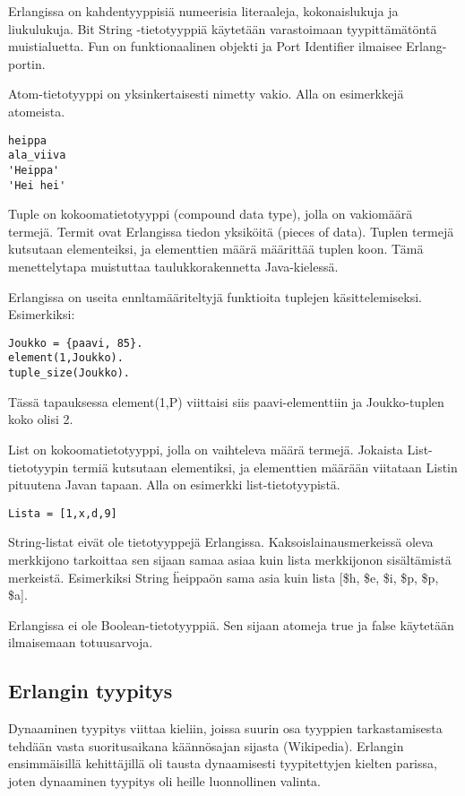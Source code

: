 \documentclass[11pt,oneside,a4paper]{article}
\begin{document}
Erlangissa on kahdentyyppisiä numeerisia literaaleja, kokonaislukuja ja
liukulukuja. Bit String
-tietotyyppiä käytetään varastoimaan tyypittämätöntä muistialuetta. Fun on
funktionaalinen objekti ja Port Identifier ilmaisee Erlang-portin. 

Atom-tietotyyppi on yksinkertaisesti nimetty vakio. Alla on esimerkkejä
atomeista.

\begin{verbatim}
heippa
ala_viiva
'Heippa'
'Hei hei'
\end{verbatim}
Tuple on kokoomatietotyyppi (compound data type), jolla on vakiomäärä termejä.
Termit ovat Erlangissa tiedon yksiköitä (pieces of data). Tuplen termejä
kutsutaan elementeiksi, ja elementtien määrä määrittää tuplen koon. Tämä
menettelytapa
muistuttaa taulukkorakennetta Java-kielessä.

Erlangissa on useita ennltamääriteltyjä funktioita tuplejen käsittelemiseksi.
Esimerkiksi:

\begin{verbatim}
Joukko = {paavi, 85}.
element(1,Joukko).
tuple_size(Joukko).
\end{verbatim}
Tässä tapauksessa element(1,P) viittaisi siis paavi-elementtiin ja Joukko-tuplen
koko olisi 2.

List on kokoomatietotyyppi, jolla on vaihteleva määrä termejä. Jokaista
List-tietotyypin termiä kutsutaan elementiksi, ja elementtien määrään viitataan
Listin pituutena Javan tapaan. Alla on esimerkki list-tietotyypistä.

\begin{verbatim}
Lista = [1,x,d,9] 
\end{verbatim}
String-listat eivät ole tietotyyppejä Erlangissa. Kaksoislainausmerkeissä oleva
merkkijono tarkoittaa sen sijaan samaa asiaa kuin lista merkkijonon sisältämistä
merkeistä. Esimerkiksi String \"heippa\" on sama asia kuin lista [\$h, \$e, \$i,
\$p, \$p, \$a]. 

Erlangissa ei ole Boolean-tietotyyppiä. Sen sijaan atomeja true ja false
käytetään ilmaisemaan totuusarvoja. 

\subsection{Erlangin tyypitys}

Dynaaminen tyypitys viittaa kieliin, joissa suurin osa tyyppien tarkastamisesta
tehdään vasta suoritusaikana käännösajan sijasta (Wikipedia). Erlangin
ensimmäisillä kehittäjillä oli tausta dynaamisesti tyypitettyjen kielten
parissa, joten dynaaminen tyypitys oli heille luonnollinen valinta. 
\end{document}
